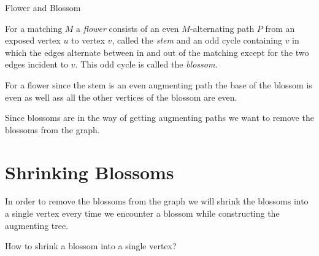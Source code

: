 \begin{Definition}{Flower and Blossom}{}
	\begin{minipage}{0.65\textwidth}
		For a matching $M$ a \emph{flower} consists of an even $M$-alternating path $P$ from an exposed vertex $u$ to vertex $v$, called the \emph{stem} and an odd cycle containing $v$ in which the edges alternate between in and out of the matching except for the two edges incident to $v$. This odd cycle is called the \emph{blossom}.
	\end{minipage}\hspace{5pt}
	\begin{minipage}{0.25\textwidth}
		\usetikzlibrary{decorations.pathreplacing,arrows.meta, calc}
	\end{minipage}
\end{Definition}

\begin{observation}
	For a flower since the stem is an even augmenting path the base of the blossom is even as well ass all the other vertices of the blossom are even.
\end{observation}

Since blossoms are in the way of getting augmenting paths we want to remove the blossoms from the graph.
\section{Shrinking Blossoms}
In order to remove the blossoms from the graph we will shrink the blossoms into a single vertex every time we encounter a blossom while constructing the augmenting tree.
\begin{question}{}{}
	How to shrink a blossom into a single vertex?
\end{question}

